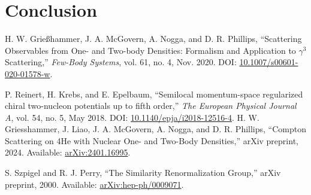 \documentclass[a4paper,11pt]{article}
\begin{document}
\section{Conclusion}
\begin{thebibliography}{99}
  H. W. Grie{\ss}hammer, J. A. McGovern, A. Nogga, and D. R.
  Phillips, ``Scattering Observables from One- and Two-body
  Densities: Formalism and Application to $\gamma^3$ Scattering,''
  \textit{Few-Body Systems}, vol. 61, no. 4, Nov. 2020. DOI:
  \href{https://doi.org/10.1007/s00601-020-01578-w}{10.1007/s00601-020-01578-w}.

  P. Reinert, H. Krebs, and E. Epelbaum, ``Semilocal momentum-space
  regularized chiral two-nucleon potentials up to fifth order,''
  \textit{The European Physical Journal A}, vol. 54, no. 5, May 2018.
  DOI:
  \href{http://dx.doi.org/10.1140/epja/i2018-12516-4}{10.1140/epja/i2018-12516-4}.
  H. W. Griesshammer, J. Liao, J. A. McGovern, A. Nogga, and D. R.
  Phillips, ``Compton Scattering on 4He with Nuclear One- and
  Two-Body Densities,'' arXiv preprint, 2024. Available:
  \href{https://arxiv.org/abs/2401.16995}{arXiv:2401.16995}.

S. Szpigel and R. J. Perry, ``The Similarity Renormalization Group,'' arXiv preprint, 2000. Available: \href{https://arxiv.org/abs/hep-ph/0009071}{arXiv:hep-ph/0009071}.
\end{thebibliography}
\end{document}
